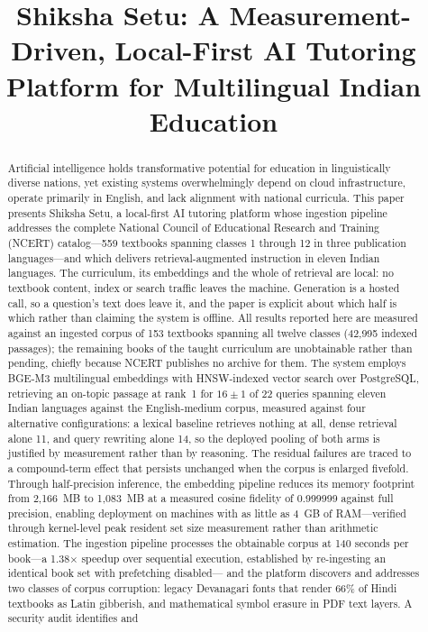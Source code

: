 \documentclass[conference]{IEEEtran}
\begin{document}
\title{Shiksha Setu: A Measurement-Driven, Local-First AI Tutoring Platform for Multilingual Indian Education}

\author{
}

\maketitle

\begin{abstract}
Artificial intelligence holds transformative potential for education in linguistically diverse nations, yet existing systems overwhelmingly depend on cloud infrastructure, operate primarily in English, and lack alignment with national curricula. This paper presents Shiksha Setu, a local-first AI tutoring platform whose ingestion pipeline addresses the complete National Council of Educational Research and Training (NCERT) catalog---559 textbooks spanning classes 1 through 12 in three publication languages---and which delivers retrieval-augmented instruction in eleven Indian languages. The curriculum, its embeddings and the whole of retrieval are local: no textbook content, index or search traffic leaves the machine. Generation is a hosted call, so a question's text does leave it, and the paper is explicit about which half is which rather than claiming the system is offline. All results reported here are measured against an ingested corpus of 153 textbooks spanning all twelve classes (42{,}995 indexed passages); the remaining books of the taught curriculum are unobtainable rather than pending, chiefly because NCERT publishes no archive for them. The system employs BGE-M3 multilingual embeddings with HNSW-indexed vector search over PostgreSQL, retrieving an on-topic passage at rank~1 for $16\pm1$ of 22 queries spanning eleven Indian languages against the English-medium corpus, measured against four alternative configurations: a lexical baseline retrieves nothing at all, dense retrieval alone 11, and query rewriting alone 14, so the deployed pooling of both arms is justified by measurement rather than by reasoning. The residual failures are traced to a compound-term effect that persists unchanged when the corpus is enlarged fivefold. Through half-precision inference, the embedding pipeline reduces its memory footprint from 2,166~MB to 1,083~MB at a measured cosine fidelity of 0.999999 against full precision, enabling deployment on machines with as little as 4~GB of RAM---verified through kernel-level peak resident set size measurement rather than arithmetic estimation. The ingestion pipeline processes the obtainable corpus at 140 seconds per book---a 1.38$\times$ speedup over sequential execution, established by re-ingesting an identical book set with prefetching disabled--- and the platform discovers and addresses two classes of corpus corruption: legacy Devanagari fonts that render 66\% of Hindi textbooks as Latin gibberish, and mathematical symbol erasure in PDF text layers. A security audit identifies and 
\end{abstract}
\end{document}

